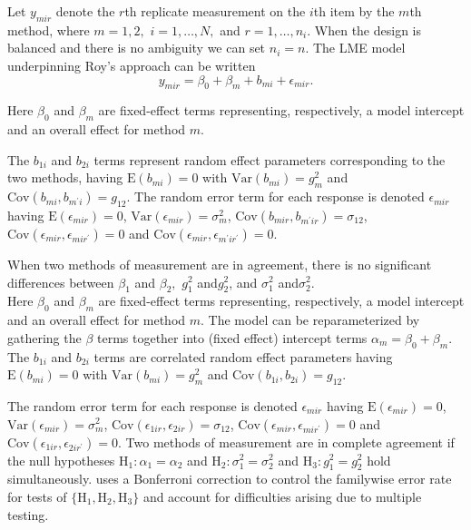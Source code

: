 \documentclass[12pt, a4paper]{report}
\theoremstyle{plain}
\theoremstyle{definition}
\theoremstyle{remark}
\begin{document}
Let $y_{mir} $ denote the $r$th replicate measurement on the $i$th item by the $m$th method, where $m=1,2,$ $i=1,\ldots,N,$ and $r = 1,\ldots,n_i.$ When the design is balanced and there is no ambiguity we can set $n_i=n.$ The LME model underpinning Roy's approach can be written
\begin{equation}\label{Roy-model}
y_{mir} = \beta_{0} + \beta_{m} + b_{mi} + \epsilon_{mir}.
\end{equation}

Here $\beta_0$ and $\beta_m$ are fixed-effect terms representing, respectively, a model intercept and an overall effect for method $m.$ 


The $b_{1i}$ and $b_{2i}$ terms represent random effect parameters corresponding to the two methods, having $\mathrm{E}(b_{mi})=0$ with $\mathrm{Var}(b_{mi})=g^2_m$ and $\mathrm{Cov}(b_{mi}, b_{m^\prime i})=g_{12}.$ The random error term for each response is denoted $\epsilon_{mir}$ having $\mathrm{E}(\epsilon_{mir})=0$, $\mathrm{Var}(\epsilon_{mir})=\sigma^2_m$, $\mathrm{Cov}(b_{mir}, b_{m^\prime ir})=\sigma_{12}$, $\mathrm{Cov}(\epsilon_{mir}, \epsilon_{mir^\prime})= 0$ and $\mathrm{Cov}(\epsilon_{mir}, \epsilon_{m^\prime ir^\prime})= 0.$


When two methods of measurement are in agreement, there is no significant differences between $\beta_1$ and $\beta_2,$ $g^2_1 $ and$ g^2_2$, and $\sigma^2_1 $ and$ \sigma^2_2$.\\
\bigskip
Here $\beta_0$ and $\beta_m$ are fixed-effect terms representing, respectively, a model intercept and an overall effect for method $m.$ The model can be reparameterized by gathering the $\beta$ terms together into (fixed effect) intercept terms $\alpha_m=\beta_0+\beta_m.$ The $b_{1i}$ and $b_{2i}$ terms are correlated random effect parameters having $\mathrm{E}(b_{mi})=0$ with $\mathrm{Var}(b_{mi})=g^2_m$ and $\mathrm{Cov}(b_{1i}, b_{2 i})=g_{12}.$ \\
\bigskip

The random error term for each response is denoted $\epsilon_{mir}$ having $\mathrm{E}(\epsilon_{mir})=0$, $\mathrm{Var}(\epsilon_{mir})=\sigma^2_m$, $\mathrm{Cov}(\epsilon_{1ir}, \epsilon_{2 ir})=\sigma_{12}$, $\mathrm{Cov}(\epsilon_{mir}, \epsilon_{mir^\prime})= 0$ and $\mathrm{Cov}(\epsilon_{1ir}, \epsilon_{2 ir^\prime})= 0.$ Two methods of measurement are in complete agreement if the null hypotheses $\mathrm{H}_1\colon \alpha_1 = \alpha_2$ and $\mathrm{H}_2\colon \sigma^2_1 = \sigma^2_2 $ and $\mathrm{H}_3\colon g^2_1= g^2_2$ hold simultaneously. \citet{roy} uses a Bonferroni correction to control the familywise error rate for tests of $\{\mathrm{H}_1, \mathrm{H}_2, \mathrm{H}_3\}$ and account for difficulties arising due to multiple testing. \\
\bigskip
\end{document}
